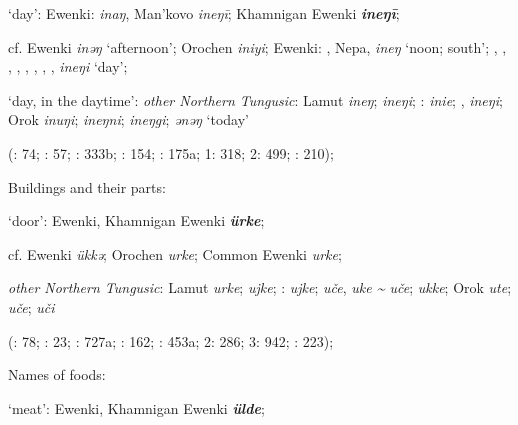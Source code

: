 \documentclass[output=paper,colorlinks,citecolor=brown]{langscibook}
\begin{document}
\begin{xlist}
\begin{xlist}
    \ex ‘day’:  Ewenki:  \textit{inaŋ}, Man’kovo \textit{ineŋī}; Khamnigan Ewenki \textbf{\textit{ineŋī}};

    cf.  Ewenki \textit{inǝŋ} ‘afternoon’; Orochen \textit{iniyi};  Ewenki: , Nepa,  \textit{ineŋ} ‘noon; south’; , , , , , , , ,  \textit{ineŋi} ‘day’;

    ‘day, in the daytime’: \textit{other Northern Tungusic}: Lamut \textit{ineŋ};  \textit{ineŋi}; \textit{}:  \textit{inie}; ,  \textit{ineŋi}; Orok \textit{inuŋi};  \textit{ineŋni};  \textit{ineŋgi};  \textit{ǝnǝŋ} ‘today’ 
    
    (\citealt{Castrén1856}: 74; \citealt{Janhunen1991}: 57; \citealt{Dorji1998}: 333b; \citealt{Chaoke2014a}: 154; \citealt{Vasilevic1958}: 175a; \citealt{Cincius1975B} 1: 318; \citealt{Hauer1952} 2: 499; \citealt{Zikmundová2013a}: 210);

\end{xlist}

    \ex Buildings and their parts:

\begin{xlist}
    \ex ‘door’:  Ewenki, Khamnigan Ewenki \textbf{\textit{ürke}};

    cf.  Ewenki \textit{ükkǝ}; Orochen \textit{urke};  Common Ewenki \textit{urke};

    \textit{other Northern Tungusic}: Lamut \textit{urke};  \textit{ujke}; \textit{}:  \textit{ujke};  \textit{uče},  \textit{uke {\textasciitilde} uče};  \textit{ukke}; Orok \textit{ute};  \textit{uče};  \textit{uči} 
    
    (\citealt{Castrén1856}: 78; \citealt{Janhunen1991}: 23; \citealt{Dorji1998}: 727a; \citealt{Chaoke2014a}: 162; \citealt{Vasilevic1958}: 453a; \citealt{Cincius1975B} 2: 286; \citealt{Hauer1952} 3: 942; \citealt{Zikmundová2013a}: 223);

\end{xlist}

    \ex Names of foods:

\begin{xlist}
    \ex ‘meat’:  Ewenki, Khamnigan Ewenki \textbf{\textit{ülde}};


\end{xlist}
\end{xlist}
\end{document}
